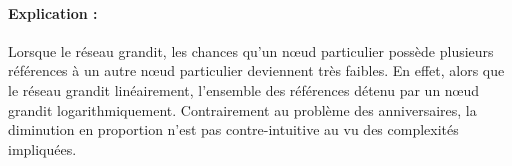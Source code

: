 \paragraph{Explication :} Lorsque le réseau grandit, les chances qu'un nœud
particulier possède plusieurs références à un autre nœud particulier deviennent
très faibles. En effet, alors que le réseau grandit linéairement, l'ensemble des
références détenu par un nœud grandit logarithmiquement. Contrairement au
problème des anniversaires, la diminution en proportion n'est pas
contre-intuitive au vu des complexités impliquées.


